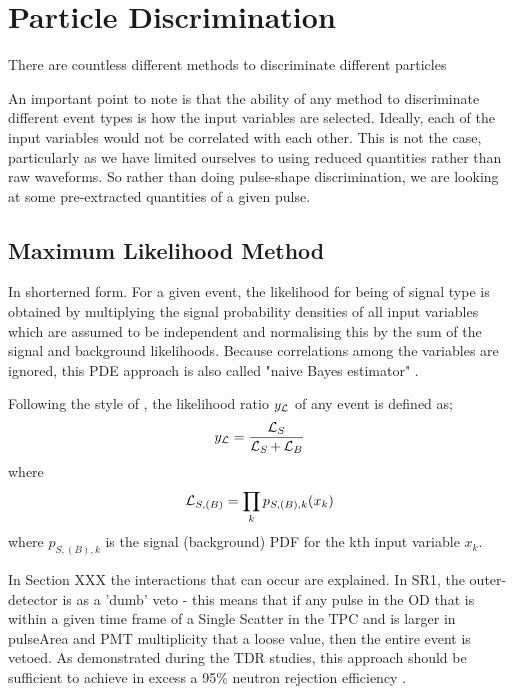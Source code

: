 \section{Particle Discrimination}
\par
There are countless different methods to discriminate different particles


\par
An important point to note is that the ability of any method to discriminate different event types is how the input variables are selected.
Ideally, each of the input variables would not be correlated with each other.
This is not the case, particularly as we have limited ourselves to using reduced quantities rather than raw waveforms.
So rather than doing pulse-shape discrimination, we are looking at some pre-extracted quantities of a given pulse.

\subsection{Maximum Likelihood Method}
\par
In shorterned form. 
For a given event, the likelihood for being of signal type is obtained by multiplying the signal probability densities of all input variables which are assumed to be independent and normalising this by the sum of the signal and background likelihoods.
Because correlations among the variables are ignored, this PDE approach is also called "naive Bayes estimator" \cite{TMVA_ref}.

Following the style of \cite{TMVA_ref}, the likelihood ratio $y_{\operatorname{\mathcal{L}}}$ of any event is defined as;
\begin{equation}
    y_{\operatorname{\mathcal{L}}} = \frac{\operatorname{\mathcal{L}}_{S}}{\operatorname{\mathcal{L}}_{S} + \operatorname{\mathcal{L}}_{B}}
\end{equation}
where
\begin{equation}
    \operatorname{\mathcal{L}}_{S,(B)} = \prod_k p_{S,(B),k}(x_k)
\end{equation}
where $p_{S,(B),k}$ is the signal (background) PDF for the kth input variable $x_k$.

\par
In Section XXX the interactions that can occur are explained.
In SR1, the outer-detector is as a 'dumb' veto - this means that if any pulse in the OD that is within a given time frame of a Single Scatter in the TPC and is larger in pulseArea and PMT multiplicity that a loose value, then the entire event is vetoed.
As demonstrated during the TDR studies, this approach should be sufficient to achieve in excess a 95\% neutron rejection efficiency \cite{LZ_TechnicalDesignReview_ref}.

